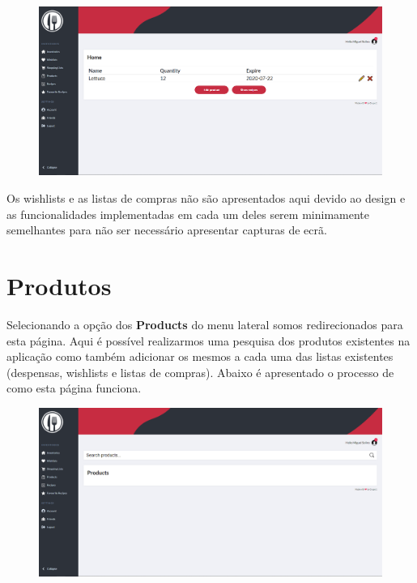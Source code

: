 \documentclass[a4paper]{report}
\begin{document}
    \begin{figure}[H]
        \centering
            \includegraphics[width=\textwidth]{images/produto_final/pagina_iventario_partilhado.png}
    \end{figure}

    Os wishlists e as listas de compras não são apresentados aqui devido ao 
    design e as funcionalidades implementadas em cada um deles serem 
    minimamente semelhantes para não ser necessário apresentar capturas de 
    ecrã.

    \section{Produtos}

    Selecionando a opção dos \textbf{Products} do menu lateral somos
    redirecionados para esta página. Aqui é possível realizarmos uma 
    pesquisa dos produtos existentes na aplicação como também adicionar
    os mesmos a cada uma das listas existentes (despensas, wishlists e 
    listas de compras). Abaixo é apresentado o processo de como esta 
    página funciona.

    \begin{figure}[H]
        \centering
            \includegraphics[width=\textwidth]{images/produto_final/procura_de_produtos.png}
    \end{figure}
\end{document}
